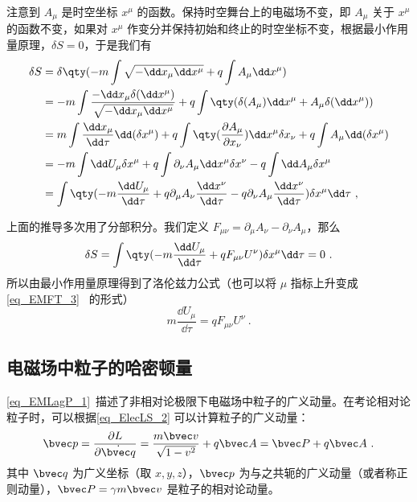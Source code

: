 注意到 $A_\mu$ 是时空坐标 $x^\mu$ 的函数。保持时空舞台上的电磁场不变，即 $A_\mu$ 关于 $x^\mu$ 的函数不变，如果对 $x^\mu$ 作变分并保持初始和终止的时空坐标不变，根据最小作用量原理，$\delta S=0$，于是我们有
\begin{equation}
\begin{aligned}
\delta S&=\delta\qty( -m\int \sqrt{-\dd x_\mu \dd x^\mu} +q\int A_\mu \dd x^\mu)\\
&=-m\int \frac{-\dd x_\mu \delta (\dd x^\mu)}{\sqrt{-\dd x_\mu \dd x^\mu}}+q\int \qty(\delta(A_\mu)\dd x^\mu + A_\mu \delta(\dd x^\mu))\\
&=m\int \frac{\dd x_\mu}{\dd \tau}\dd(\delta x^\mu)+q\int\qty(\frac{\partial A_\mu}{\partial x_\nu})\dd x^\mu \delta x_\nu+q\int A_\mu \dd(\delta x^\mu)\\
&=-m\int\dd U_\mu \delta x^\mu+q\int \partial_\nu A_\mu \dd x^\mu\delta x^\nu-q\int \dd A_\mu \delta x^\mu\\
&=\int \qty(-m\frac{\dd U_\mu}{\dd \tau} + q\partial_\mu A_\nu \frac{\dd x^\nu}{\dd \tau}-q\partial_\nu A_\mu\frac{\dd x^\nu}{\dd \tau})\delta x^\mu\dd \tau~,\\
\end{aligned}
\end{equation}

上面的推导多次用了分部积分。我们定义 $F_{\mu\nu}=\partial_{\mu}A_\nu-\partial_\nu A_\mu$，那么
\begin{equation}
\delta S=\int\qty(-m\frac{\dd U_\mu}{\dd \tau}+qF_{\mu\nu}U^\nu)\delta x^\mu \dd \tau=0~.
\end{equation}
所以由最小作用量原理得到了洛伦兹力公式（也可以将 $\mu$ 指标上升变成 \autoref{eq_EMFT_3}~ 的形式）
\begin{equation}
m\frac{\dd U_\mu}{\dd \tau}=qF_{\mu\nu} U^\nu~.
\end{equation}
\subsection{电磁场中粒子的哈密顿量}
\autoref{eq_EMLagP_1}~描述了非相对论极限下电磁场中粒子的广义动量。在考论相对论粒子时，可以根据\autoref{eq_ElecLS_2} 可以计算粒子的广义动量：
\begin{equation}
\bvec p=\frac{\partial L}{\partial \dot {\bvec q}}=\frac{m\bvec v}{\sqrt{1-v^2}}+q\bvec A=\bvec P+q\bvec A~.
\end{equation}
其中 $\bvec q$ 为广义坐标（取 $x,y,z$），$\bvec p$ 为与之共轭的广义动量（或者称正则动量），$\bvec P=\gamma m\bvec v$ 是粒子的相对论动量。

